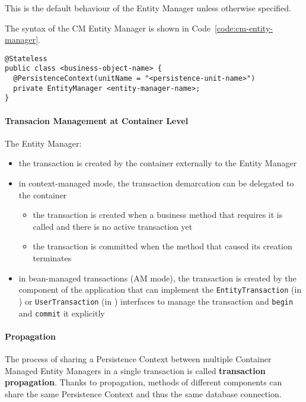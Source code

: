 \documentclass[english]{article}
\begin{document}
This is the default behaviour of the Entity Manager unless otherwise specified.

The syntax of the CM Entity Manager is shown in Code~\ref{code:cm-entity-manager}.

\begin{lstlisting}[language=annotatedjava, caption={CM Entity Manager}, label=code:cm-entity-manager]
@Stateless
public class <business-object-name> {
  @PersistenceContext(unitName = "<persistence-unit-name>")
  private EntityManager <entity-manager-name>;
}
\end{lstlisting}

\paragraph{Transacion Management at Container Level}

The \jpa Entity Manager:

\begin{itemize}
  \item the transaction is created by the container externally to the Entity Manager
  \item in context-managed mode, the transaction demarcation can be delegated to the container
        \begin{itemize}
          \item the transaction is created when a business method that requires it is called and there is no active transaction yet
          \item the transaction is committed when the method that caused its creation terminates
        \end{itemize}
  \item in bean-managed transactions (AM mode), the transaction is created by the component of the application that can implement the \texttt{EntityTransaction} (in \jpa) or \texttt{UserTransaction} (in \jta) interfaces to manage the transaction and \texttt{begin} and \texttt{commit} it explicitly
\end{itemize}

\paragraph{Propagation}

The process of sharing a Persistence Context between multiple Container Managed Entity Managers in a single \jta transaction is called \textbf{transaction propagation}.
Thanks to propagation, methods of different components can share the same Persistence Context and thus the same database connection.
\end{document}
